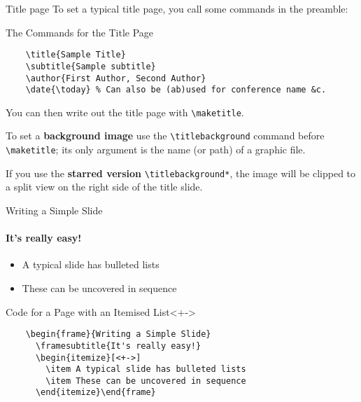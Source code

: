 \documentclass{beamer}
\begin{document}
\begin{frame}[fragile]{Title page}
    To set a typical title page, you call some commands in the preamble:
    \begin{block}{The Commands for the Title Page}
        \begin{verbatim}
    \title{Sample Title}
    \subtitle{Sample subtitle}
    \author{First Author, Second Author}
    \date{\today} % Can also be (ab)used for conference name &c.
    \end{verbatim}
    \end{block}
    You can then write out the title page with \verb|\maketitle|.

    To set a \textbf{background image} use the \verb|\titlebackground| command
    before \verb|\maketitle|; its only argument is the name (or path) of a graphic
    file.

    If you use the \textbf{starred version} \verb|\titlebackground*|, the image
    will be clipped to a split view on the right side of the title slide.

\end{frame}

\begin{frame}[fragile]{Writing a Simple Slide}
    \framesubtitle{It's really easy!}
    \begin{itemize}[<+->]
        \item A typical slide has bulleted lists
        \item These can be uncovered in sequence
    \end{itemize}
    \begin{block}{Code for a Page with an Itemised List}<+->
        \begin{verbatim}
    \begin{frame}{Writing a Simple Slide}
      \framesubtitle{It's really easy!}
      \begin{itemize}[<+->]
        \item A typical slide has bulleted lists
        \item These can be uncovered in sequence
      \end{itemize}\end{frame}
    \end{verbatim}
    \end{block}
\end{frame}
\end{document}
